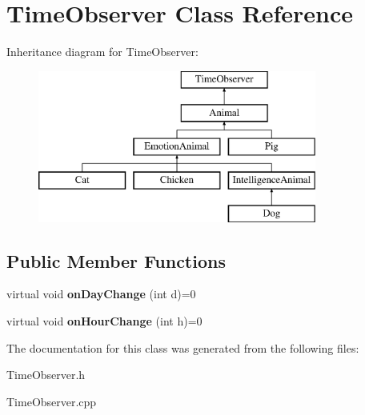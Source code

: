 \hypertarget{class_time_observer}{}\section{Time\+Observer Class Reference}
\label{class_time_observer}
Inheritance diagram for Time\+Observer\+:\begin{figure}[H]
\begin{center}
\leavevmode
\includegraphics[height=5.000000cm]{class_time_observer}
\end{center}
\end{figure}
\subsection*{Public Member Functions}
\begin{DoxyCompactItemize}
\item 
\mbox{\label{class_time_observer_ad544685a6cdd7f7fe75a7696c297cdd7}} 
virtual void {\bfseries on\+Day\+Change} (int d)=0
\item 
\mbox{\label{class_time_observer_aa9bb5f414aca97a7b06ea4c9f4638171}} 
virtual void {\bfseries on\+Hour\+Change} (int h)=0
\end{DoxyCompactItemize}


The documentation for this class was generated from the following files\+:\begin{DoxyCompactItemize}
\item 
Time\+Observer.\+h\item 
Time\+Observer.\+cpp\end{DoxyCompactItemize}

